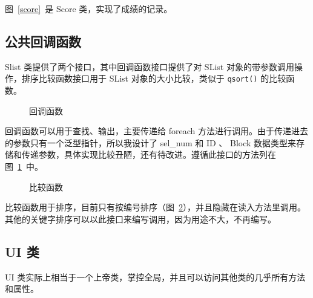 图~\ref{score}~是 Score 类，实现了成绩的记录。

\subsection{公共回调函数}
\label{sec_callback}

Slist 类提供了两个接口，其中回调函数接口提供了对 SList 对象的带参数调用操作，排序比较函数接口用于 SList 对象的大小比较，类似于 \verb|qsort()| 的比较函数。

\begin{figure}[htp]
  \pictext\small
{}  \caption{\label{callback}回调函数}
\end{figure}

回调函数可以用于查找、输出，主要传递给 foreach 方法进行调用。由于传递进去的参数只有一个泛型指针，所以我设计了 sel\_num 和 ID 、 Block 数据类型来存储和传递参数，具体实现比较丑陋，还有待改进。遵循此接口的方法列在图~\ref{callback}~中。

\begin{figure}[htp]
  \pictext\small
{}  \caption{\label{compare}比较函数}
\end{figure}

比较函数用于排序，目前只有按编号排序（图~\ref{compare}），并且隐藏在读入方法里调用。其他的关键字排序可以以此接口来编写调用，因为用途不大，不再编写。

\subsection{UI 类}

UI 类实际上相当于一个上帝类，掌控全局，并且可以访问其他类的几乎所有方法和属性。

